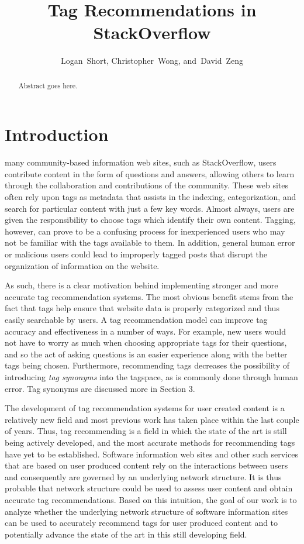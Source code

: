 \documentclass[11pt]{IEEEtran}
\begin{document}
\title{Tag Recommendations in StackOverflow}
\author{Logan~Short, Christopher~Wong, and~David~Zeng}%
\maketitle

\begin{abstract}
Abstract goes here.
\end{abstract}

\section{Introduction}

 many community-based information web sites, such as StackOverflow, users contribute content in the form of questions and answers, allowing others to learn through the collaboration and contributions of the community. These web sites often rely upon tags as metadata that assists in the indexing, categorization, and search for particular content with just a few key words. Almost always, users are given the responsibility to choose tags which identify their own content. Tagging, however, can prove to be a confusing process for inexperienced users who may not be familiar with the tags available to them. In addition, general human error or malicious users could lead to improperly tagged posts that disrupt the organization of information on the website.

As such, there is a clear motivation behind implementing stronger and more accurate tag recommendation systems. The most obvious benefit stems from the fact that tags help ensure that website data is properly categorized and thus easily searchable by users. A tag recommendation model can improve tag accuracy and effectiveness in a number of ways. For example, new users would not have to worry as much when choosing appropriate tags for their questions, and so the act of asking questions is an easier experience along with the better tags being chosen. Furthermore, recommending tags decreases the possibility of introducing \textit{tag synonyms} into the tagspace, as is commonly done through human error. Tag synonyms are discussed more in Section 3.

The development of tag recommendation systems for user created content is a relatively new field and most previous work has taken place within the last couple of years. Thus, tag recommending is a field in which the state of the art is still being actively developed, and the most accurate methods for recommending tags have yet to be established. Software information web sites and other such services that are based on user produced content rely on the interactions between users and consequently are governed by an underlying network structure. It is thus probable that network structure could be used to assess user content and obtain accurate tag recommendations. Based on this intuition, the goal of our work is to analyze whether the underlying network structure of software information sites can be used to accurately recommend tags for user produced content and to potentially advance the state of the art in this still developing field.
\end{document}
